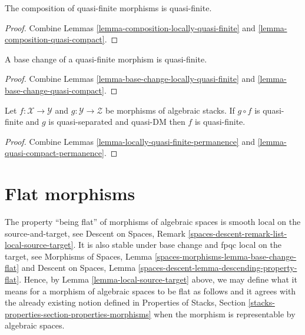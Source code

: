 \begin{lemma}
\label{lemma-composition-quasi-finite}
The composition of quasi-finite morphisms is quasi-finite.
\end{lemma}

\begin{proof}
Combine
Lemmas \ref{lemma-composition-locally-quasi-finite} and
\ref{lemma-composition-quasi-compact}.
\end{proof}

\begin{lemma}
\label{lemma-base-change-quasi-finite}
A base change of a quasi-finite morphism is quasi-finite.
\end{lemma}

\begin{proof}
Combine
Lemmas \ref{lemma-base-change-locally-quasi-finite} and
\ref{lemma-base-change-quasi-compact}.
\end{proof}

\begin{lemma}
\label{lemma-quasi-finite-permanence}
Let $f : \mathcal{X} \to \mathcal{Y}$ and
$g : \mathcal{Y} \to \mathcal{Z}$ be morphisms of algebraic stacks.
If $g \circ f$ is quasi-finite and $g$ is quasi-separated and quasi-DM
then $f$ is quasi-finite.
\end{lemma}

\begin{proof}
Combine
Lemmas \ref{lemma-locally-quasi-finite-permanence} and
\ref{lemma-quasi-compact-permanence}.
\end{proof}












\section{Flat morphisms}
\label{section-flat}

\noindent
The property ``being flat'' of morphisms of algebraic
spaces is smooth local on the source-and-target, see
Descent on Spaces, Remark \ref{spaces-descent-remark-list-local-source-target}.
It is also stable under base change and fpqc local on the target, see
Morphisms of Spaces,
Lemma \ref{spaces-morphisms-lemma-base-change-flat}
and
Descent on Spaces, Lemma
\ref{spaces-descent-lemma-descending-property-flat}.
Hence, by
Lemma \ref{lemma-local-source-target}
above, we may define what it means for a morphism of algebraic spaces
to be flat as follows and it agrees with the already
existing notion defined in
Properties of Stacks,
Section \ref{stacks-properties-section-properties-morphisms}
when the morphism is representable by algebraic spaces.

